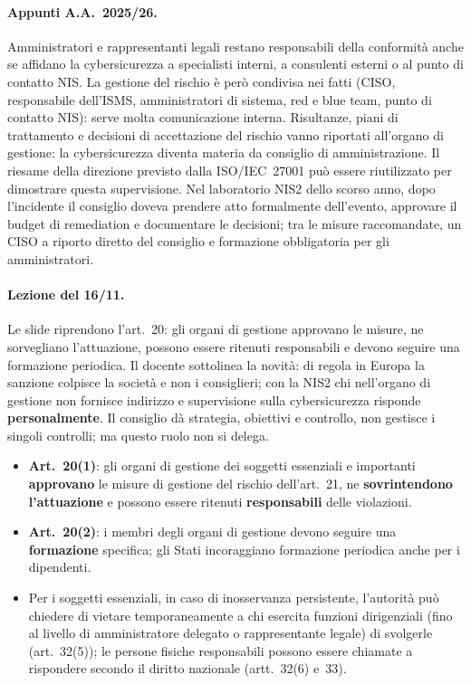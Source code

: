 \paragraph{Appunti A.A.~2025/26.} Amministratori e rappresentanti legali restano responsabili della
conformità anche se affidano la cybersicurezza a specialisti interni, a consulenti esterni o al punto
di contatto NIS. La gestione del rischio è però condivisa nei fatti (CISO, responsabile dell'ISMS,
amministratori di sistema, red e blue team, punto di contatto NIS): serve molta comunicazione interna.
Risultanze, piani di trattamento e decisioni di accettazione del rischio vanno riportati all'organo di
gestione: la cybersicurezza diventa materia da consiglio di amministrazione. Il riesame della
direzione previsto dalla ISO/IEC~27001 può essere riutilizzato per dimostrare questa supervisione. Nel
laboratorio NIS2 dello scorso anno, dopo l'incidente il consiglio doveva prendere atto formalmente
dell'evento, approvare il budget di remediation e documentare le decisioni; tra le misure raccomandate,
un CISO a riporto diretto del consiglio e formazione obbligatoria per gli amministratori.

\paragraph{Lezione del 16/11.} Le slide riprendono l'art.~20: gli organi di gestione approvano le
misure, ne sorvegliano l'attuazione, possono essere ritenuti responsabili e devono seguire una
formazione periodica. Il docente sottolinea la novità: di regola in Europa la sanzione colpisce la
società e non i consiglieri; con la NIS2 chi nell'organo di gestione non fornisce indirizzo e
supervisione sulla cybersicurezza risponde \textbf{personalmente}. Il consiglio dà strategia, obiettivi
e controllo, non gestisce i singoli controlli; ma questo ruolo non si delega.

\begin{integrazione}
\begin{itemize}
  \item \textbf{Art.~20(1)}: gli organi di gestione dei soggetti essenziali e importanti
    \textbf{approvano} le misure di gestione del rischio dell'art.~21, ne \textbf{sovrintendono
    l'attuazione} e possono essere ritenuti \textbf{responsabili} delle violazioni.
  \item \textbf{Art.~20(2)}: i membri degli organi di gestione devono seguire una
    \textbf{formazione} specifica; gli Stati incoraggiano formazione periodica anche per i dipendenti.
  \item Per i soggetti essenziali, in caso di inosservanza persistente, l'autorità può chiedere di
    vietare temporaneamente a chi esercita funzioni dirigenziali (fino al livello di amministratore
    delegato o rappresentante legale) di svolgerle (art.~32(5)); le persone fisiche responsabili
    possono essere chiamate a rispondere secondo il diritto nazionale (artt.~32(6) e~33).
\end{itemize}
\end{integrazione}

